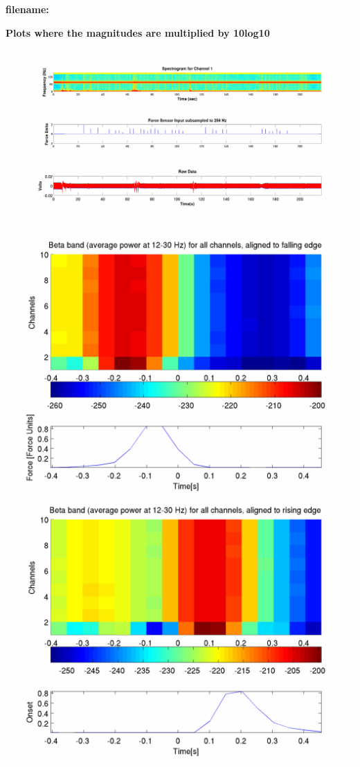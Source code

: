 \documentclass[12pt]{article}
\begin{document}
\begin{center}
\textbf{filename: \expandafter\detokenize\expandafter{\myvar}}

\textbf{Plots where the magnitudes are multiplied by 10log10}
\end{center}

\includegraphics[scale=0.14]{raw_data_spectrogram.png}

\includegraphics[scale=0.2]{beta_falling_log.png}
\includegraphics[scale=0.2]{beta_rising_log.png}
\end{document}

